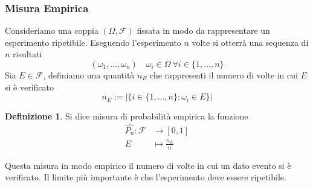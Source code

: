 \documentclass{article}
\theoremstyle{plain}
\theoremstyle{definition}
\newtheorem{definizione}{Definizione}[section]
\theoremstyle{remark}
\begin{document}
\subsubsection{Misura Empirica} %
\label{subs:misura_empirica}
Consideriamo una coppia $(\Omega,\mathscr{F})$ fissata in modo da rappresentare un esperimento ripetibile. Eseguendo l'esperimento $n$ volte si otterrà una sequenza di $n$ risultati
\begin{equation*}
	(\omega_1,...,\omega_n)\quad \omega_i\in\Omega\ \forall i\in\{1,...,n\}
\end{equation*}
Sia $E\in\mathscr{F}$, definiamo una quantità $n_E$ che rappresenti il numero di volte in cui $E$ si è verificato
\begin{equation*}
	n_E:=\lvert\{i\in\{1,...,n\}:\omega_i\in E\}\rvert
\end{equation*}
\begin{definizione}
	Si dice misura di probabilità empirica la funzione
	\begin{align*}
		\hat{P_n}:\mathscr{F}&\to[0,1]\\
		E&\mapsto\frac{n_E}{n}
	\end{align*}
\end{definizione}
Questa misura in modo empirico il numero di volte in cui un dato evento si è verificato. Il limite più importante è che l'esperimento deve essere ripetibile.
\end{document}
